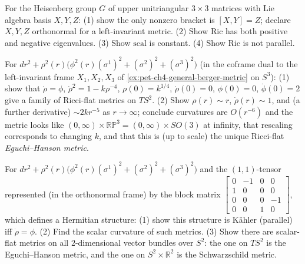 \begin{remark}
  \label{rem:pet-ch4-ex-22}
  For the Heisenberg group $G$ of upper unitriangular $3\times3$ matrices with
  Lie algebra basis $X,Y,Z$: (1) show the only nonzero bracket is $[X,Y]=Z$;
  declare $X,Y,Z$ orthonormal for a left-invariant metric. (2) Show
  $\mathrm{Ric}$ has both positive and negative eigenvalues. (3) Show
  $\mathrm{scal}$ is constant. (4) Show $\mathrm{Ric}$ is not parallel.
\end{remark}

\begin{remark}
  \label{rem:pet-ch4-ex-23}
  For $dr^2+\rho^2(r)\big(\phi^2(r)(\sigma^1)^2+(\sigma^2)^2+(\sigma^3)^2\big)$
  (in the coframe dual to the left-invariant frame $X_1,X_2,X_3$ of
  \cref{ex:pet-ch4-general-berger-metric} on $S^3$):
  (1) show that $\dot\rho=\phi$, $\dot\rho^2=1-k\rho^{-4}$,
  $\rho(0)=k^{1/4}$, $\dot\rho(0)=0$, $\phi(0)=0$, $\dot\phi(0)=2$ give a family
  of Ricci-flat metrics on $TS^2$. (2) Show $\rho(r)\sim r$, $\dot\rho(r)\sim1$,
  and (a further derivative) $\sim2kr^{-5}$ as $r\to\infty$; conclude
  curvatures are $O(r^{-6})$ and the metric looks like
  $(0,\infty)\times\mathbb{RP}^3=(0,\infty)\times SO(3)$ at infinity, that
  rescaling corresponds to changing $k$, and that this is (up to scale) the
  unique Ricci-flat \emph{Eguchi--Hanson metric}.
\end{remark}

\begin{remark}
  \label{rem:pet-ch4-ex-24}
  For $dr^2+\rho^2(r)\big(\phi^2(r)(\sigma^1)^2+(\sigma^2)^2+(\sigma^3)^2\big)$
  and the $(1,1)$-tensor represented (in the orthonormal frame) by the block
  matrix $\left[\begin{smallmatrix}0&-1&0&0\\1&0&0&0\\0&0&0&-1\\0&0&1&0\end{smallmatrix}\right]$,
  which defines a Hermitian structure: (1) show this structure is Kähler
  (parallel) iff $\dot\rho=\phi$. (2) Find the scalar curvature of such
  metrics. (3) Show there are scalar-flat metrics on all $2$-dimensional
  vector bundles over $S^2$: the one on $TS^2$ is the Eguchi--Hanson metric,
  and the one on $S^2\times\mathbb{R}^2$ is the Schwarzschild metric.
\end{remark}


